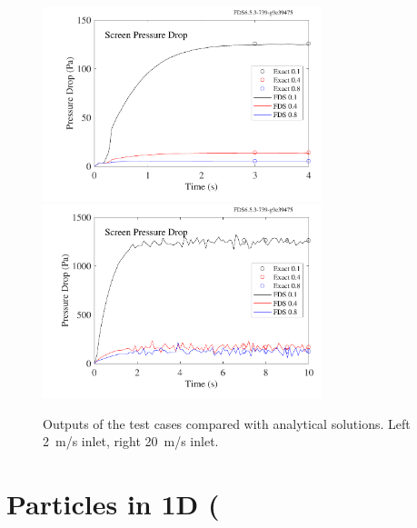 \documentclass[11pt]{book}
\begin{document}
\begin{figure}[ht]
\includegraphics[width=3.2in]{SCRIPT_FIGURES/screen_drag_1}
\includegraphics[width=3.2in]{SCRIPT_FIGURES/screen_drag_2}
\caption[Sample cases ]{Outputs of the  test cases compared with analytical solutions.  Left 2~m/s inlet, right 20~m/s inlet.}
\label{screen_drag_plots}
\end{figure}

\section{Particles in 1D (\texorpdfstring{})}
\end{document}
